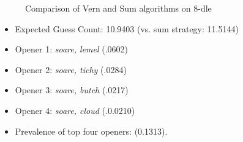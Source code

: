 \documentclass[11pt, oneside]{article} 	%
\begin{document}
\begin{figure}[!htb]
 \centering
 \qquad
 \caption{Comparison of Vern and Sum algorithms on 8-dle}%
\end{figure}


\begin{itemize}
\item Expected Guess Count: 10.9403 (vs. sum strategy: 11.5144)
\item Opener 1: \emph{soare, lemel} (.0602)
\item Opener 2: \emph{soare, tichy} (.0284)
\item Opener 3: \emph{soare, butch} (.0217)
\item Opener 4: \emph{soare, cloud} (.0.0210)
\item Prevalence of top four openers: (0.1313). 
\end{itemize}
\end{document}
